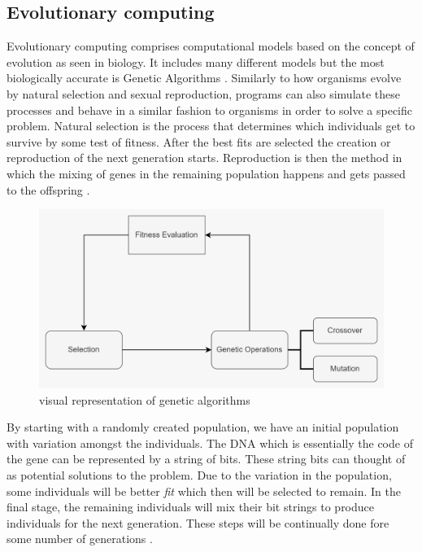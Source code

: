 \subsection{Evolutionary computing}
Evolutionary computing comprises computational models based on the concept of evolution as seen in biology. It includes many different models but the most biologically accurate is Genetic Algorithms \cite{drugan2019reinforcement} . Similarly to how organisms evolve by natural selection and sexual reproduction, programs can also simulate these processes and behave in a similar fashion to organisms in order to solve a specific problem. Natural selection is the process that determines which individuals get to survive by some test of fitness. After the best fits are selected the creation or reproduction of the next generation starts. Reproduction is then the method in which the mixing of genes in the remaining population happens and gets passed to the offspring \cite{holland1992genetic}.
\begin{figure}[H]
    \centering
    \includegraphics [scale = 0.13]{Images/PHOTO-2024-05-20-17-50-27.jpg}
    \caption{visual representation of genetic algorithms}
    \label{figGA}
\end{figure}

By starting with a randomly created population, we have an initial population with variation amongst the individuals. The DNA which is essentially the code of the gene can be represented by a string of bits. These string bits can thought of as potential solutions to the problem. Due to the variation in the population, some individuals will be better \textit{fit} which then will be selected to remain. In the final stage, the remaining individuals will mix their bit strings to produce individuals for the next generation. These steps will be continually done fore some number of generations \cite{forrest1996genetic}. 

